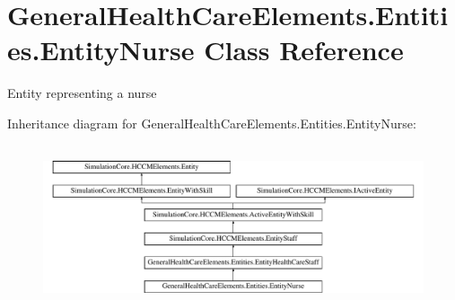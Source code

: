\hypertarget{class_general_health_care_elements_1_1_entities_1_1_entity_nurse}{}\section{General\+Health\+Care\+Elements.\+Entities.\+Entity\+Nurse Class Reference}
\label{class_general_health_care_elements_1_1_entities_1_1_entity_nurse}


Entity representing a nurse  


Inheritance diagram for General\+Health\+Care\+Elements.\+Entities.\+Entity\+Nurse\+:\begin{figure}[H]
\begin{center}
\leavevmode
\includegraphics[height=4.827586cm]{class_general_health_care_elements_1_1_entities_1_1_entity_nurse}
\end{center}
\end{figure}
